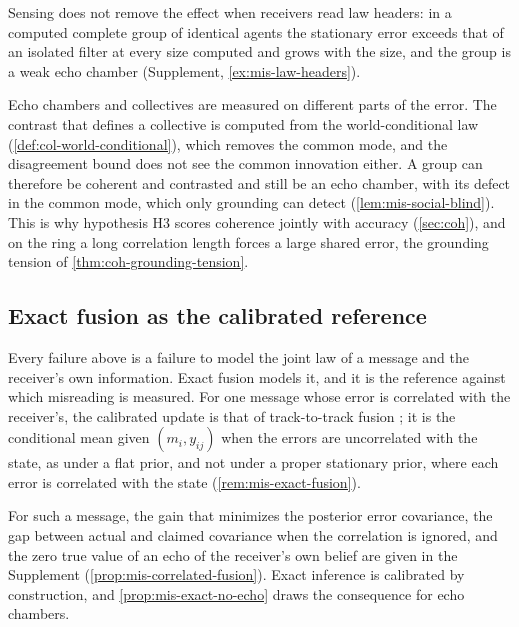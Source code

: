 Sensing does not remove the effect when receivers read law headers: in a computed complete group of identical agents the stationary error exceeds that of an isolated filter at every size computed and grows with the size, and the group is a weak echo chamber (Supplement, \cref{ex:mis-law-headers}).

Echo chambers and collectives are measured on different parts of the error. The contrast that defines a collective is computed from the world-conditional law (\cref{def:col-world-conditional}), which removes the common mode, and the disagreement bound does not see the common innovation either. A group can therefore be coherent and contrasted and still be an echo chamber, with its defect in the common mode, which only grounding can detect (\cref{lem:mis-social-blind}). This is why hypothesis H3 scores coherence jointly with accuracy (\cref{sec:coh}), and on the ring a long correlation length forces a large shared error, the grounding tension of \cref{thm:coh-grounding-tension}.

\subsection{Exact fusion as the calibrated reference}\label{sec:mis-exact}

Every failure above is a failure to model the joint law of a message and the receiver's own information. Exact fusion models it, and it is the reference against which misreading is measured. For one message whose error is correlated with the receiver's, the calibrated update is that of track-to-track fusion \citep{barshalom1981track,barshalom1986effect}; it is the conditional mean given $(m_i,y_{ij})$ when the errors are uncorrelated with the state, as under a flat prior, and not under a proper stationary prior, where each error is correlated with the state (\cref{rem:mis-exact-fusion}).

For such a message, the gain that minimizes the posterior error covariance, the gap between actual and claimed covariance when the correlation is ignored, and the zero true value of an echo of the receiver's own belief are given in the Supplement (\cref{prop:mis-correlated-fusion}). Exact inference is calibrated by construction, and \cref{prop:mis-exact-no-echo} draws the consequence for echo chambers.

